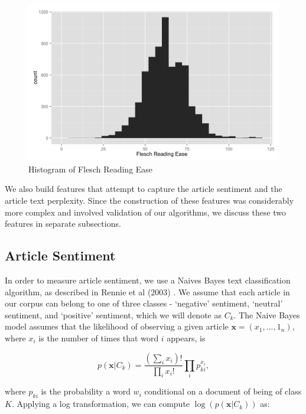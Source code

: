 \documentclass[fleqn,12pt]{SelfArx} %
\begin{document}
\begin{description}
\begin{figure}[ht]\centering
\includegraphics[width=\linewidth]{flesch_data_histogram.png}
\caption{Histogram of Flesch Reading Ease}
\label{fig:fre_hist}
\end{figure}	
	
\end{description}

We also build features that attempt to capture the article sentiment and the article text perplexity. Since the construction of these features was considerably more complex and involved validation of our algorithms, we discuss these two features in separate subsections.

\subsection{Article Sentiment}

In order to measure article sentiment, we use a Naives Bayes text classification algorithm, as described in Rennie et al (2003) \cite{rennie2003tackling}. We assume that each article in our corpus can belong to one of three classes - `negative' sentiment, `neutral' sentiment, and `positive' sentiment, which we will denote as $C_k$. The Naive Bayes model assumes that the likelihood of observing a given article $\mathbf{x} = (x_1, ..., 1_n)$, where $x_i$ is the number of times that word $i$ appears, is 

\begin{equation}
p(\mathbf{x}|C_k) = \frac{\left ( \sum_i x_i \right )!}{\prod_i x_i !} \prod_i p_{ki}^{x_i},
\end{equation} 

\noindent where $p_{ki}$ is the probability a word $w_i$ conditional on a document of being of class $K$. Applying a log transformation, we can compute $\log(p(\mathbf{x}|C_k))$ as:
\end{document}
